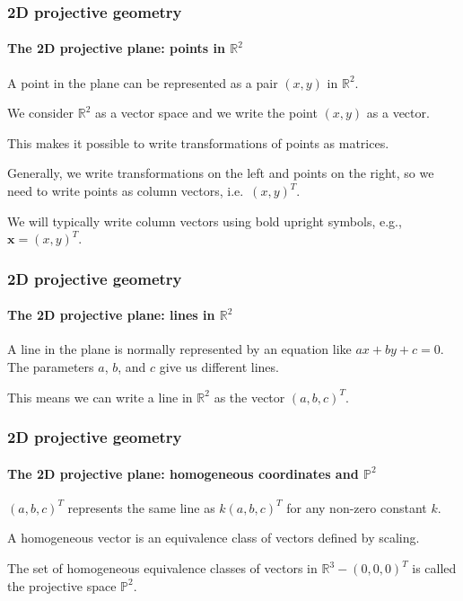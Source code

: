 \documentclass[aspectratio=169]{beamer}
\renewcommand{\vec}[1]{\boldsymbol{#1}}
\def\Rset{\mathbb{R}}
\def\Pset{\mathbb{P}}
\begin{document}
\begin{frame}
\frametitle{2D projective geometry}
\framesubtitle{The 2D projective plane: points in $\Rset^2$}

A \alert{point} in the plane can be represented as a pair $(x,y)$ in
$\Rset^2$.

\medskip

We consider $\Rset^2$ as a vector space and we write the point $(x,y)$
as a vector.

\medskip

This makes it possible to write transformations of points as matrices.

\medskip

Generally, we write transformations on the left and points on the
right, so we need to write points as column vectors, i.e.\ $(x,y)^T$.

\medskip

We will typically write column vectors using bold upright symbols, e.g.,
$\vec{x} = (x,y)^T$.

\end{frame}

\begin{frame}
\frametitle{2D projective geometry}
\framesubtitle{The 2D projective plane: lines in $\Rset^2$}

A \alert{line} in the plane is normally represented by an equation
like $ax+by+c=0$.  The parameters $a$, $b$, and $c$ give us different
lines.

\medskip

This means we can write a line in $\Rset^2$ as the vector $(a,b,c)^T$.

\end{frame}

\begin{frame}
\frametitle{2D projective geometry}
\framesubtitle{The 2D projective plane: homogeneous coordinates and $\Pset^2$}

$(a,b,c)^T$ represents the same line as $k(a,b,c)^T$ for any non-zero
constant $k$.

\medskip

A \alert{homogeneous vector} is an equivalence class of vectors
defined by scaling.

\medskip

The set of homogeneous equivalence classes of vectors in $\Rset^3 -
(0,0,0)^T$ is called the \alert{projective space} $\Pset^2$.

\end{frame}
\end{document}
